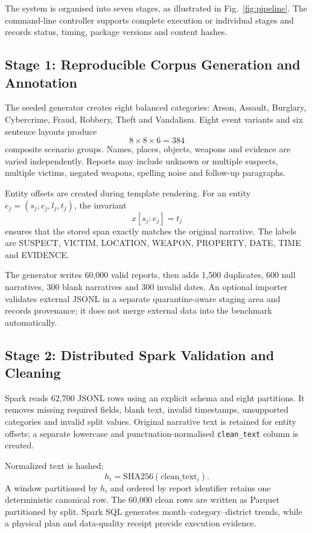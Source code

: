 \documentclass[conference]{IEEEtran}
\begin{document}
The system is organised into seven stages, as illustrated in Fig.~\ref{fig:pipeline}. The command-line controller supports complete execution or individual stages and records status, timing, package versions and content hashes.

\subsection{Stage 1: Reproducible Corpus Generation and Annotation}

The seeded generator creates eight balanced categories: Arson, Assault, Burglary, Cybercrime, Fraud, Robbery, Theft and Vandalism. Eight event variants and six sentence layouts produce
\begin{equation}
8\times8\times6=384
\end{equation}
composite scenario groups. Names, places, objects, weapons and evidence are varied independently. Reports may include unknown or multiple suspects, multiple victims, negated weapons, spelling noise and follow-up paragraphs.

Entity offsets are created during template rendering. For an entity $e_j=(s_j,e_j,l_j,t_j)$, the invariant
\begin{equation}
x[s_j:e_j]=t_j
\end{equation}
ensures that the stored span exactly matches the original narrative. The labels are SUSPECT, VICTIM, LOCATION, WEAPON, PROPERTY, DATE, TIME and EVIDENCE.

The generator writes 60,000 valid reports, then adds 1,500 duplicates, 600 null narratives, 300 blank narratives and 300 invalid dates. An optional importer validates external JSONL in a separate quarantine-aware staging area and records provenance; it does not merge external data into the benchmark automatically.

\subsection{Stage 2: Distributed Spark Validation and Cleaning}

Spark reads 62,700 JSONL rows using an explicit schema and eight partitions. It removes missing required fields, blank text, invalid timestamps, unsupported categories and invalid split values. Original narrative text is retained for entity offsets; a separate lowercase and punctuation-normalised \texttt{clean\_text} column is created.

Normalized text is hashed:
\begin{equation}
h_i=\mathrm{SHA256}(\mathrm{clean\_text}_i).
\end{equation}
A window partitioned by $h_i$ and ordered by report identifier retains one deterministic canonical row. The 60,000 clean rows are written as Parquet partitioned by split. Spark SQL generates month--category--district trends, while a physical plan and data-quality receipt provide execution evidence.
\end{document}
